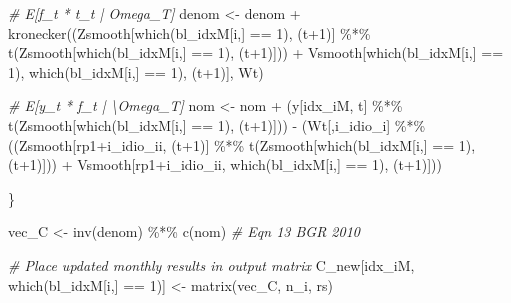 \documentclass[
]{article}
\newenvironment{Shaded}{\begin{snugshade}}{\end{snugshade}}
\newcommand{\CommentTok}[1]{\textcolor[rgb]{0.56,0.35,0.01}{\textit{#1}}}
\newcommand{\DecValTok}[1]{\textcolor[rgb]{0.00,0.00,0.81}{#1}}
\newcommand{\FunctionTok}[1]{\textcolor[rgb]{0.00,0.00,0.00}{#1}}
\newcommand{\NormalTok}[1]{#1}
\newcommand{\OtherTok}[1]{\textcolor[rgb]{0.56,0.35,0.01}{#1}}
\newcommand{\SpecialCharTok}[1]{\textcolor[rgb]{0.00,0.00,0.00}{#1}}
\begin{document}
\begin{Shaded}
\begin{Highlighting}[]
      \CommentTok{\# E[f\_t * t\_t\textquotesingle{} | Omega\_T]}
\NormalTok{      denom }\OtherTok{\textless{}{-}}\NormalTok{ denom }\SpecialCharTok{+} 
        \FunctionTok{kronecker}\NormalTok{((Zsmooth[}\FunctionTok{which}\NormalTok{(bl\_idxM[i,] }\SpecialCharTok{==} \DecValTok{1}\NormalTok{), (t}\SpecialCharTok{+}\DecValTok{1}\NormalTok{)] }\SpecialCharTok{\%*\%} \FunctionTok{t}\NormalTok{(Zsmooth[}\FunctionTok{which}\NormalTok{(bl\_idxM[i,] }\SpecialCharTok{==} \DecValTok{1}\NormalTok{), (t}\SpecialCharTok{+}\DecValTok{1}\NormalTok{)])) }\SpecialCharTok{+} 
\NormalTok{                    Vsmooth[}\FunctionTok{which}\NormalTok{(bl\_idxM[i,] }\SpecialCharTok{==} \DecValTok{1}\NormalTok{), }\FunctionTok{which}\NormalTok{(bl\_idxM[i,] }\SpecialCharTok{==} \DecValTok{1}\NormalTok{), (t}\SpecialCharTok{+}\DecValTok{1}\NormalTok{)], Wt)}
      
      \CommentTok{\# E[y\_t * f\_t\textquotesingle{} | \textbackslash{}Omega\_T]}
\NormalTok{      nom }\OtherTok{\textless{}{-}}\NormalTok{ nom }\SpecialCharTok{+} 
\NormalTok{        (y[idx\_iM, t] }\SpecialCharTok{\%*\%} \FunctionTok{t}\NormalTok{(Zsmooth[}\FunctionTok{which}\NormalTok{(bl\_idxM[i,] }\SpecialCharTok{==} \DecValTok{1}\NormalTok{), (t}\SpecialCharTok{+}\DecValTok{1}\NormalTok{)])) }\SpecialCharTok{{-}} 
\NormalTok{        (Wt[,i\_idio\_i] }\SpecialCharTok{\%*\%}\NormalTok{ ((Zsmooth[rp1}\SpecialCharTok{+}\NormalTok{i\_idio\_ii, (t}\SpecialCharTok{+}\DecValTok{1}\NormalTok{)] }\SpecialCharTok{\%*\%} \FunctionTok{t}\NormalTok{(Zsmooth[}\FunctionTok{which}\NormalTok{(bl\_idxM[i,] }\SpecialCharTok{==} \DecValTok{1}\NormalTok{), (t}\SpecialCharTok{+}\DecValTok{1}\NormalTok{)])) }\SpecialCharTok{+} 
\NormalTok{                              Vsmooth[rp1}\SpecialCharTok{+}\NormalTok{i\_idio\_ii, }\FunctionTok{which}\NormalTok{(bl\_idxM[i,] }\SpecialCharTok{==} \DecValTok{1}\NormalTok{), (t}\SpecialCharTok{+}\DecValTok{1}\NormalTok{)]))}
      
\NormalTok{    \}}
    
\NormalTok{    vec\_C }\OtherTok{\textless{}{-}} \FunctionTok{inv}\NormalTok{(denom) }\SpecialCharTok{\%*\%} \FunctionTok{c}\NormalTok{(nom) }\CommentTok{\# Eqn 13 BGR 2010}
    
    \CommentTok{\# Place updated monthly results in output matrix}
\NormalTok{    C\_new[idx\_iM, }\FunctionTok{which}\NormalTok{(bl\_idxM[i,] }\SpecialCharTok{==} \DecValTok{1}\NormalTok{)] }\OtherTok{\textless{}{-}} \FunctionTok{matrix}\NormalTok{(vec\_C, n\_i, rs)}
    

\end{Highlighting}
\end{Shaded}
\end{document}
